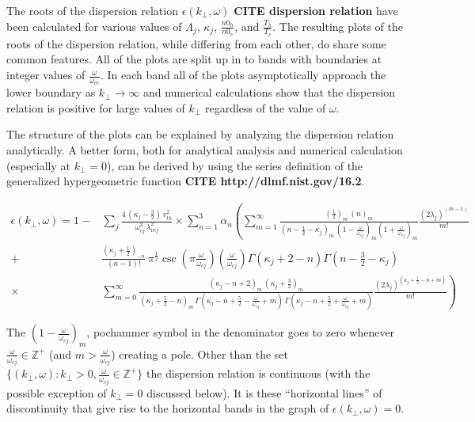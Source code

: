 \documentclass[12pt,a4paper]{article}
\begin{document}
    The roots of the dispersion relation $\epsilon(k_\perp, \omega)$ \textbf{CITE dispersion relation} have been calculated for various values of $\Lambda_j$, $\kappa_j$, $\frac{n0_h}{n0_e}$, and $\frac{T_h}{T_c}$.
    The resulting plots of the roots of the dispersion relation, while differing from each other, do share some common features.
    All of the plots are split up in to bands with boundaries at integer values of $\frac{\omega}{\omega_{ce}}$.
    In each band all of the plots asymptotically approach the lower boundary as $k_\perp \rightarrow \infty$ and numerical calculations show that the dispersion relation is positive for large values of $k_\perp$ regardless of the value of $\omega$.

    The structure of the plots can be explained by analyzing the dispersion relation analytically.
    A better form, both for analytical analysis and numerical calculation (especially at $k_\perp = 0$), can be derived by using the series definition of the generalized hypergeometric function \textbf{CITE http://dlmf.nist.gov/16.2}.

    \begin{align}
        \nonumber \epsilon(k_\perp, \omega) = 1 -& \sum_j \frac{4 \, (\kappa_j - \frac{3}{2}) \, v^2_{th}}{\omega^2_{cj} \, \lambda^2_{\nu c j}} \times \sum_{n = 1}^3 \alpha_n \left( \sum_{m = 1}^\infty \frac{ (\frac{1}{2})_m \, (n)_m }{(n - \frac{1}{2} - \kappa_j)_m \, (1 - \frac{\omega}{\omega_{cj}})_m (1 + \frac{\omega}{\omega_{cj}})_m } \frac{(2 \lambda_j)^{(m - 1)}}{m!} \right. \\
        \nonumber +& \left. \frac{(\kappa_j + \frac{1}{2})_{-n}}{(n - 1)!} \, \pi^{\frac{1}{2}} \csc\left(\pi \frac{\omega}{\omega_{cj}}\right) \left(\frac{\omega}{\omega_{cj}}\right) \Gamma(\kappa_j + 2 - n) \Gamma(n - \frac{3}{2} - \kappa_j) \right.\\
        \times& \left. \sum_{m = 0}^\infty \frac{(\kappa_j - n + 2)_m \, (\kappa_j + \frac{3}{2})_m}{(\kappa_j + \frac{5}{2} - n)_m \, \Gamma(\kappa_j - n + \frac{5}{2} - \frac{\omega}{\omega_{cj}} + m) \, \Gamma(\kappa_j - n + \frac{5}{2} + \frac{\omega}{\omega_{cj}} + m)} \frac{(2 \lambda_j)^{(\kappa_j + \frac{1}{2} - n + m)}}{m!} \right)
    \end{align}

    The $(1 - \frac{\omega}{\omega_{cj}})_m$, pochammer symbol in the denominator goes to zero whenever $\frac{\omega}{\omega_{cj}} \in \mathbb{Z}^+$ (and $m > \frac{\omega}{\omega_{cj}}$) creating a pole.
    Other than the set $\{(k_\perp, \omega) : k_\perp > 0, \frac{\omega}{\omega_{cj}} \in \mathbb{Z}^+\}$ the dispersion relation is continuous (with the possible exception of $k_\perp = 0$ discussed below).
    It is these ``horizontal lines'' of discontinuity that give rise to the horizontal bands in the graph of $\epsilon(k_\perp, \omega) = 0$.
\end{document}
